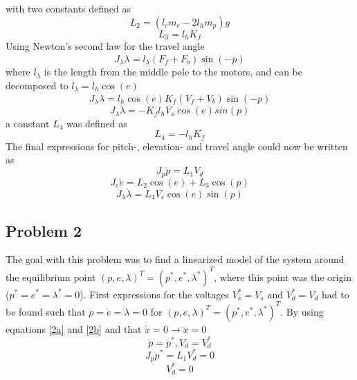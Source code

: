 with two constants defined as
    \begin{equation}
        L_2 = (l_c m_c - 2l_h m_p)g 
    \end{equation}
    \begin{equation}
        L_3 = l_h  K_f 
    \end{equation}
Using Newton's second law for the travel angle
    \begin{equation*}\label{eg og landa}
        J_\lambda \ddot \lambda = l_\lambda (F_f + F_b) \sin (-p)
    \end{equation*}
where $l_\lambda$ is the length from the middle pole to the motors, and can be decomposed to $l_\lambda = l_h \cos(e)$
    \begin{equation*}
        J_\lambda \ddot \lambda= l_h \cos(e) K_f (V_f + V_b) \sin (-p)
    \end{equation*}
    \begin{equation*}
        J_\lambda \ddot \lambda= -K_f l_h V_s \cos(e) sin(p)
    \end{equation*}
a constant $L_4$ was defined as
    \begin{equation}
        L_4 = -l_h K_f
    \end{equation}
The final expressions for pitch-, elevation- and travel angle could now be written as
\begin{equation}
    J_p \ddot p = L_1 V_d
    \label{2a}
\end{equation}
\begin{equation}
    J_e \ddot e = L_2 \cos(e) + L_3 \cos(p)
    \label{2b}
\end{equation}
\begin{equation}
    J_{\lambda} \ddot \lambda = L_4 V_s \cos(e) \sin(p)
    \label{2c}
\end{equation}

\subsection{Problem 2}
The goal with this problem was to find a linearized model of the system around the equilibrium point $(p,e,\lambda)^T = (p^*,e^*,\lambda^*)^T$, where this point was the origin ($p^* = e^* = \lambda^* = 0$). First expressions for the voltages $V_s^* = V_s$ and $V_d^* = V_d$ had to be found such that $\dot{p} = \dot{e} = \dot{\lambda} = 0$ for $(p,e,\lambda)^T = (p^*,e^*,\lambda^*)^T$. By using equations \eqref{2a} and \eqref{2b} and that $\dot{x} = 0 \rightarrow \ddot{x} = 0$
\begin{equation*}
    \ddot{p} = \ddot{p}^*, V_d = V_d^*
\end{equation*}
\begin{equation*}
    J_p\ddot{p}^* = L_1 V_d^* = 0
\end{equation*}
\begin{equation}\label{eq:Vdstar}
    V_d^* = 0
\end{equation}

